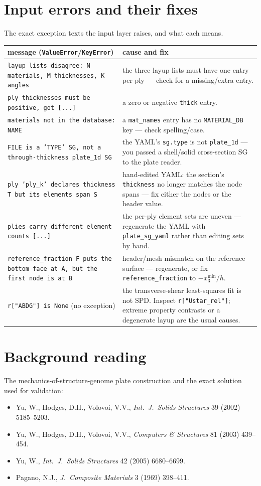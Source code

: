 \documentclass[11pt]{article}
\newcommand{\code}[1]{\texttt{#1}}
\begin{document}
\section{Input errors and their fixes}\label{sec:errors}
The exact exception texts the input layer raises, and what each means.
\begin{center}
\begin{tabular}{p{7.6cm}p{7.2cm}}
\toprule
message (\code{ValueError}/\code{KeyError}) & cause and fix \\
\midrule
\code{layup lists disagree: N materials, M thicknesses, K angles} &
the three layup lists must have one entry per ply --- check for a
missing/extra entry. \\
\code{ply thicknesses must be positive, got [...]} &
a zero or negative \code{thick} entry. \\
\code{materials not in the database: NAME} &
a \code{mat\_names} entry has no \code{MATERIAL\_DB} key --- check
spelling/case. \\
\code{FILE is a 'TYPE' SG, not a through-thickness plate\_1d SG} &
the YAML's \code{sg.type} is not \code{plate\_1d} --- you passed a
shell/solid cross-section SG to the plate reader. \\
\code{ply 'ply\_k' declares thickness T but its elements span S} &
hand-edited YAML: the section's \code{thickness} no longer matches the
node spans --- fix either the nodes or the header value. \\
\code{plies carry different element counts [...]} &
the per-ply element sets are uneven --- regenerate the YAML with
\code{plate\_sg\_yaml} rather than editing sets by hand. \\
\code{reference\_fraction F puts the bottom face at A, but the first
node is at B} &
header/mesh mismatch on the reference surface --- regenerate, or fix
\code{reference\_fraction} to $-x_3^{\min}/h$. \\
\midrule
\code{r["ABDG"] is None} (no exception) &
the transverse-shear least-squares fit is not SPD.  Inspect
\code{r["Ustar\_rel"]}; extreme property contrasts or a degenerate
layup are the usual causes. \\
\bottomrule
\end{tabular}
\end{center}

\section*{Background reading}
The mechanics-of-structure-genome plate construction and the exact
solution used for validation:
\begin{itemize}
\item Yu, W., Hodges, D.H., Volovoi, V.V., \emph{Int.\ J.\ Solids
Structures} 39 (2002) 5185--5203.
\item Yu, W., Hodges, D.H., Volovoi, V.V., \emph{Computers \&
Structures} 81 (2003) 439--454.
\item Yu, W., \emph{Int.\ J.\ Solids Structures} 42 (2005) 6680--6699.
\item Pagano, N.J., \emph{J.\ Composite Materials} 3 (1969) 398--411.
\end{itemize}
\end{document}
